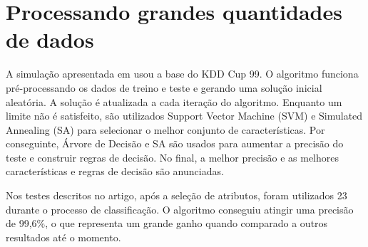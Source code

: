 \section{Processando grandes quantidades de dados}
A simulação apresentada em \cite{lin12} usou a base do KDD Cup 99. O algoritmo funciona pré-processando os dados de treino e teste e gerando uma solução
inicial aleatória. A solução é atualizada a cada iteração do algoritmo. Enquanto um limite não é satisfeito,
são utilizados Support Vector Machine (SVM) e Simulated Annealing (SA) para selecionar o melhor conjunto de
características. Por conseguinte, Árvore de Decisão e SA são usados para aumentar a precisão do teste e construir
regras de decisão. No final, a melhor precisão e as melhores características e regras de decisão são anunciadas.
\par Nos testes descritos no  artigo, após a seleção de atributos, foram utilizados 23 durante o processo de
classificação. O algoritmo conseguiu atingir uma precisão de 99,6\%, o que representa um grande ganho quando comparado
 a outros resultados até o momento.



